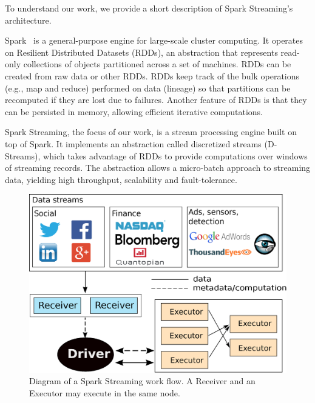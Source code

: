 %
To understand our work, we provide a short description of Spark Streaming's architecture.

Spark~\cite{Spark} is a general-purpose engine for large-scale cluster computing. It operates on Resilient Distributed Datasets (RDDs), an abstraction that represents read-only collections of objects partitioned across a set of machines. RDDs can be created from raw data or other RDDs. 
RDDs keep track of the bulk operations (e.g., map and reduce) performed on data (lineage) so that partitions can be recomputed if they are lost due to failures. 
Another feature of RDDs is that they can be persisted in memory, allowing efficient iterative computations.

Spark Streaming, the focus of our work, is a stream processing engine built on top of Spark.
It implements an abstraction called discretized streams (D-Streams), which takes advantage of RDDs to provide computations over windows of streaming records.
The abstraction allows a micro-batch approach to streaming data, yielding high throughput, scalability and fault-tolerance.

\begin{figure}[t!]
  \begin{center}
    \includegraphics[scale=0.35]{images_graphs/spark_architecture_v4.eps}
  \end{center}
  \caption{Diagram of a Spark Streaming work flow. A Receiver and an Executor may execute in the same node.}
  \label{fig:SparkStreaming_architecture}
\end{figure}

